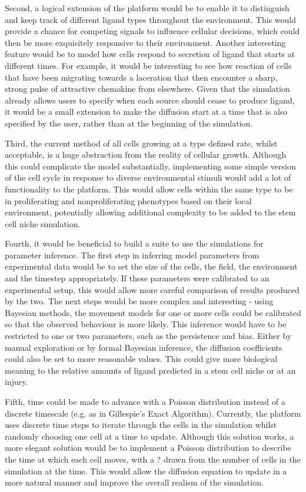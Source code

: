 \documentclass[12pt]{article}
\begin{document}
Second, a logical extension of the platform would be to enable it to 
distinguish and keep track of different ligand types throughout the 
environment. This would provide a chance for competing signals to 
influence cellular decisions, which could then be more exquisitely 
responsive to their environment. Another interesting feature would be to 
model how cells respond to secretion of ligand that starts at different 
times. For example, it would be interesting to see how reaction of cells 
that have been migrating towards a laceration that then encounter a 
sharp, strong pulse of attractive chemokine from elsewhere. Given that 
the simulation already allows users to specify when each source should 
cease to produce ligand, it would be a small extension to make the 
diffusion start at a time that is also specified by the user, rather 
than at the beginning of the simulation. 

Third, the current method of all cells growing at a type defined rate, 
whilst acceptable, is a huge abstraction from the reality of cellular 
growth. Although this could complicate the model substantially, 
implementing some simple version of the cell cycle in response to 
diverse environmental stimuli would add a lot of functionality to the 
platform. This would allow cells within the same type to be in 
proliferating and nonproliferating phenotypes based on their local 
environment, potentially allowing additional complexity to be added to 
the stem cell niche simulation.

Fourth, it would be beneficial to build a suite to use the simulations 
for parameter inference. The first step in inferring model parameters 
from experimental data would be to set the size of the cells, the field, 
the environment and the timestep appropriately. If these parameters were 
calibrated to an experimental setup, this would allow more careful 
comparison of results produced by the two. The next steps would be more 
complex and interesting - using Bayesian methods, the movement models 
for one or more cells could be calibrated so that the observed behaviour 
is more likely. This inference would have to be restricted to one or two 
parameters, such as the persistence and bias. Either by manual 
exploration or by formal Bayesian inference, the diffusion coefficients 
could also be set to more reasonable values. This could give more 
biological meaning to the relative amounts of ligand predicted in a stem 
cell niche or at an injury.

Fifth, time could be made to advance with a Poisson distribution instead 
of a discrete timescale (e.g. as in Gillespie's Exact Algorithm). 
Currently, the platform uses discrete time steps to iterate through the 
cells in the simulation whilst randomly choosing one cell at a time to 
update. Although this solution works, a more elegant solution would be 
to implement a Poisson distribution to describe the time at which each 
cell moves, with a ? drawn from the number of cells in the simulation at 
the time. This would allow the diffusion equation to update in a more 
natural manner and improve the overall realism of the simulation.
\end{document}
